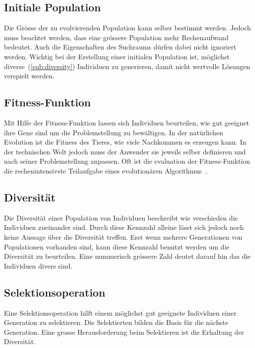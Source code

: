     \subsection{Initiale Population}

      Die Grösse der zu evolvierenden Population kann selber bestimmt werden.
      Jedoch muss beachtet werden, dass eine grössere Population mehr Rechenaufwand bedeutet.
      Auch die Eigenschaften des Suchraums dürfen dabei nicht ignoriert werden.
      Wichtig bei der Erstellung einer initialen Population ist,
      möglichst diverse~(\vref{sub:diversity}) Individuen zu generieren,
      damit nicht wertvolle Lösungen verspielt werden.

    \subsection{Fitness-Funktion}

      Mit Hilfe der Fitness-Funktion lassen sich Individuen beurteilen,
      wie gut geeignet ihre Gene sind um die Problemstellung zu bewältigen.
      In der natürlichen Evolution ist die Fitness des Tieres, wie viele Nachkommen es erzeugen kann.
      In der technischen Welt jedoch muss der Anwender sie jeweils selber definieren und
      nach seiner Problemstellung anpassen. Oft ist die evaluation der Fitness-Funktion
      die rechenintensivste Teilaufgabe eines evolutionären Algorithmus~\cite[S.22]{book:bioInspired}.

    \subsection{Diversität\label{sub:diversity}}

      Die Diversität einer Population von Individuen beschreibt wie verschieden die Individuen zueinander sind.
      Durch diese Kennzahl alleine lässt sich jedoch noch keine Aussage über die Diversität treffen.
      Erst wenn mehrere Generationen von Populationen vorhanden sind,
      kann diese Kennzahl benutzt werden um die Diversität zu beurteilen.
      Eine nummerisch grössere Zahl deutet darauf hin das die Individuen divers sind.

    \subsection{Selektionsoperation}

      Eine Selektionsoperation hilft einem möglichst gut geeignete Individuen einer Generation zu selektieren.
      Die Selektierten bilden die Basis für die nächste Generation.
      Eine grosse Herausforderung beim Selektieren ist die Erhaltung der Diversität.

